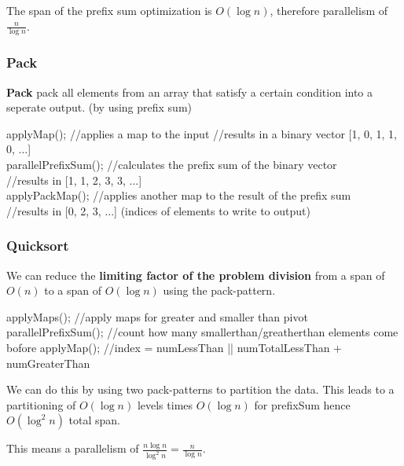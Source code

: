\begin{theorem}
The span of the prefix sum optimization is $O(\log n)$, therefore parallelism of $\frac{n}{\log n}$.
\end{theorem}

\subsubsection{Pack}

\textbf{Pack} pack all elements from an array that satisfy a certain condition into a seperate output. (by using prefix sum)

\begin{algorithm}
applyMap(); //applies a map to the input
//results in a binary vector [1, 0, 1, 1, 0, ...]\\
parallelPrefixSum(); //calculates the prefix sum of the binary vector\\
//results in [1, 1, 2, 3, 3, ...]\\
applyPackMap(); //applies another map to the result of the prefix sum\\
//results in [0, 2, 3, ...] (indices of elements to write to output)
\end{algorithm}

\subsubsection{Quicksort}

We can reduce the \textbf{limiting factor of the problem division} from a span of $O(n)$ to a span of $O(\log n)$
using the pack-pattern.

\begin{algorithm}
applyMaps(); //apply maps for greater and smaller than pivot
parallelPrefixSum(); //count how many smallerthan/greatherthan elements come bofore
applyMap(); //index = numLessThan || numTotalLessThan + numGreaterThan
\end{algorithm}

We can do this by using two pack-patterns to partition the data. This leads to a partitioning of $O(\log n)$
levels times $O(\log n)$ for prefixSum hence $O(\log^2 n)$ total span. 

This means a parallelism of $\frac{n\log n}{\log^2 n} = \frac{n}{\log n}$.

        